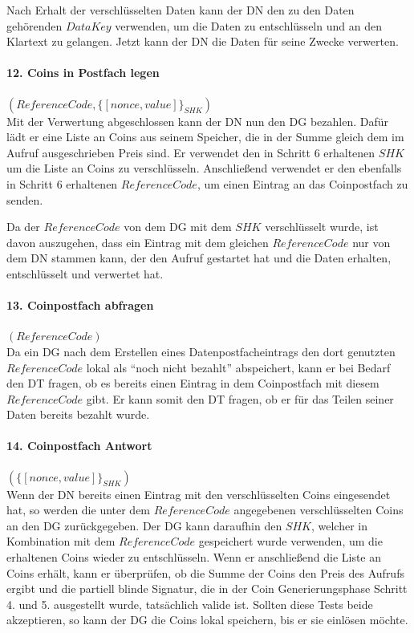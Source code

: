 \documentclass[
	fontsize=11pt,
	headings=small,
	parskip=half,           %
	bibliography=totoc,
	numbers=noenddot,       %
	open=any,               %
]{scrreprt}
\begin{document}
Nach Erhalt der verschlüsselten Daten kann der DN den zu den Daten gehörenden $DataKey$ verwenden, um die Daten zu entschlüsseln und an den Klartext zu gelangen. Jetzt kann der DN die Daten für seine Zwecke verwerten.

\paragraph{12. Coins in Postfach legen} $(ReferenceCode, \{[nonce,value]\}_{SHK})$\\
\label{para:payment_9}
Mit der Verwertung abgeschlossen kann der DN nun den DG bezahlen. Dafür lädt er eine Liste an Coins aus seinem Speicher, die in der Summe gleich dem im Aufruf ausgeschrieben Preis sind. Er verwendet den in Schritt 6 erhaltenen $SHK$ um die Liste an Coins zu verschlüsseln. Anschließend verwendet er den ebenfalls in Schritt 6 erhaltenen $ReferenceCode$, um einen Eintrag an das Coinpostfach zu senden.

Da der $ReferenceCode$ von dem DG mit dem $SHK$ verschlüsselt wurde, ist davon auszugehen, dass ein Eintrag mit dem gleichen $ReferenceCode$ nur von dem DN stammen kann, der den Aufruf gestartet hat und die Daten erhalten, entschlüsselt und verwertet hat.

\paragraph{13. Coinpostfach abfragen} $(ReferenceCode)$\\
Da ein DG nach dem Erstellen eines Datenpostfacheintrags den dort genutzten $ReferenceCode$ lokal als ``noch nicht bezahlt'' abspeichert, kann er bei Bedarf den DT fragen, ob es bereits einen Eintrag in dem Coinpostfach mit diesem $ReferenceCode$ gibt. Er kann somit den DT fragen, ob er für das Teilen seiner Daten bereits bezahlt wurde.

\paragraph{14. Coinpostfach Antwort} $(\{[nonce,value]\}_{SHK})$\\
Wenn der DN bereits einen Eintrag mit den verschlüsselten Coins eingesendet hat, so werden die unter dem $ReferenceCode$ angegebenen verschlüsselten Coins an den DG zurückgegeben. Der DG kann daraufhin den $SHK$, welcher in Kombination mit dem $ReferenceCode$ gespeichert wurde verwenden, um die erhaltenen Coins wieder zu entschlüsseln. Wenn er anschließend die Liste an Coins erhält, kann er überprüfen, ob die Summe der Coins den Preis des Aufrufs ergibt und die partiell blinde Signatur, die in der Coin Generierungsphase Schritt 4. und 5. ausgestellt wurde, tatsächlich valide ist. Sollten diese Tests beide akzeptieren, so kann der DG die Coins lokal speichern, bis er sie einlösen möchte.
\end{document}
